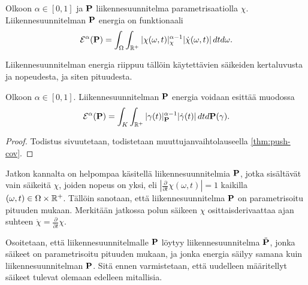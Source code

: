 \documentclass[12pt,oneside,a4paper]{amsbook} %
\begin{document}
\begin{definition}\label{def:energyOfP}
    Olkoon $\alpha \in [0, 1]$ ja $\P$ liikennesuunnitelma parametrisaatiolla $\chi$. Liikennesuunnitelman $\P$ energia on funktionaali
        \begin{equation*}
            \E^\alpha(\P) = \int_\Omega \int_{\R^+} |\chi(\omega, t)|_\chi^{\alpha-1}|\dot \chi(\omega, t)|\, dtd\omega.
        \end{equation*}
\end{definition}

Liikennesuunnitelman energia riippuu tällöin käytettävien säikeiden kertaluvusta ja nopeudesta, ja siten pituudesta.

\begin{remark}\label{thm:energyOfPIndependent}
    Olkoon $\alpha \in [0, 1].$ Liikennesuunnitelman $\P$ energia voidaan esittää muodossa
    \begin{equation*}
        \E^\alpha(\P) = \int_K \int_{\R^+}|\gamma(t)|^{\alpha-1}_\P|\dot\gamma(t)| \, dtd\P(\gamma).
    \end{equation*}
\end{remark}
\begin{proof}
    Todistus sivuutetaan, todistetaan muuttujanvaihtolauseella \ref{thm:push-cov}.
\end{proof}

Jatkon kannalta on helpompaa käsitellä liikennesuunnitelmia $\P$, jotka sisältävät vain säikeitä $\chi$, joiden nopeus on yksi, eli $|\frac{\partial}{\partial t}\chi(\omega, t)| = 1$ kaikilla $(\omega, t) \in \Omega \times \Rp$. Tällöin sanotaan, että liikennesuunnitelma $\P$ on parametrisoitu pituuden mukaan. Merkitään jatkossa polun säikeen $\chi$ osittaisderivaattaa ajan suhteen $\dot \chi = \frac{\partial}{\partial t}\chi$. 

Osoitetaan, että liikennesuunnitelmalle $\P$ löytyy liikennesuunnitelma $\tilde \P$, jonka säikeet on parametrisoitu pituuden mukaan, ja jonka energia säilyy samana kuin liikennesuunnitelman $\P$. Sitä ennen varmistetaan, että uudelleen määritellyt säikeet tulevat olemaan edelleen mitallisia.
\end{document}
